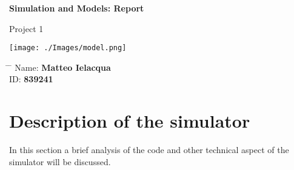 \documentclass[12pt,a4paper]{article}
\title{}
\author{}
\date{}
\begin{document}
\newcommand{\subf}[2]{%
    {\small\begin{tabular}[t]{@{}c@{}}
                #1 \\#2
            \end{tabular}}%
}

\begin{titlepage}
    \begin{center}
        \vspace*{3cm}

        \Huge
        \textbf{Simulation and Models: Report}

        \vspace{0.3cm}
        \Huge
        Project 1

        \vspace{0.8cm}
        \large



        \vspace{0.5cm}
        \LARGE


        \vspace{1.5cm}

        \textbf{}
        \texttt{[image: ./Images/model.png]}

        \vfill



        \vspace{0.8cm}



        \Large




    \end{center}
    \Large
    \begin{tabbing}
        \hspace*{1em}\= \hspace*{8em} \= \kill %
        \> Name:\>  \textbf{Matteo Ielacqua} \\
        \> ID:\>  \textbf{839241} \\
    \end{tabbing}

\end{titlepage}



\section{Description of the simulator}
In this section a brief analysis of the code and other technical aspect of the simulator will be discussed.
\end{document}
